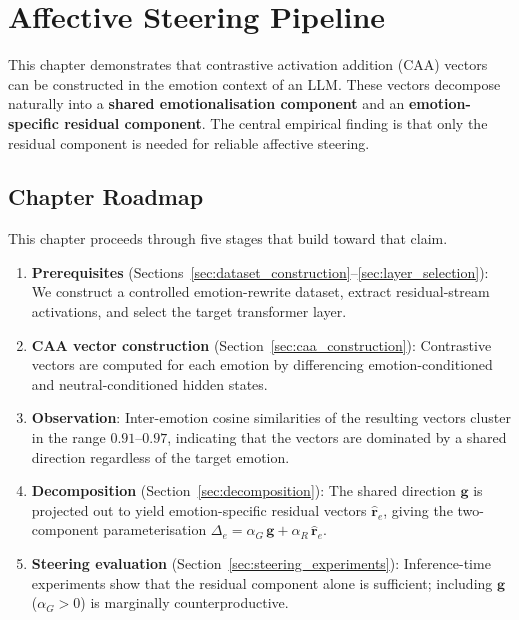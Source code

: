 \chapter{Affective Steering Pipeline}
\label{chap:development1_emo_steering}

This chapter demonstrates that contrastive activation addition (CAA) vectors can be constructed in the emotion context of an LLM. These vectors decompose naturally into a \textbf{shared emotionalisation component} and an \textbf{emotion-specific residual component}. The central empirical finding is that only the residual component is needed for reliable affective steering.

\section{Chapter Roadmap}
\label{sec:steering_roadmap_1}
This chapter proceeds through five stages that build toward that claim.

\begin{enumerate}
  \item \textbf{Prerequisites} (Sections~\ref{sec:dataset_construction}--\ref{sec:layer_selection}): We construct a controlled emotion-rewrite dataset, extract residual-stream activations, and select the target transformer layer.

  \item \textbf{CAA vector construction} (Section~\ref{sec:caa_construction}): Contrastive vectors are computed for each emotion by differencing emotion-conditioned and neutral-conditioned hidden states.

  \item \textbf{Observation}: Inter-emotion cosine similarities of the resulting vectors cluster in the range $0.91$--$0.97$, indicating that the vectors are dominated by a shared direction regardless of the target emotion.

  \item \textbf{Decomposition} (Section~\ref{sec:decomposition}): The shared direction $\mathbf{g}$ is projected out to yield emotion-specific residual vectors $\hat{\mathbf{r}}_e$, giving the two-component parameterisation $\Delta_e = \alpha_G\,\mathbf{g}+\alpha_R\,\hat{\mathbf{r}}_e$.

  \item \textbf{Steering evaluation} (Section~\ref{sec:steering_experiments}): Inference-time experiments show that the residual component alone is sufficient; including $\mathbf{g}$ ($\alpha_G > 0$) is marginally counterproductive.
\end{enumerate}

